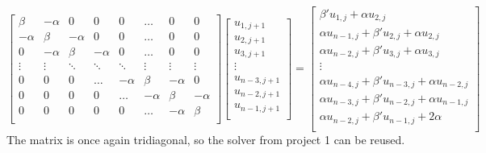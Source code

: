 \documentclass[12pt,english,a4paper]{article}
\begin{document}
\[
    \begin{bmatrix}
        \beta & -\alpha & 0 & 0 & 0 & \dots & 0 & 0  \\
        -\alpha & \beta & -\alpha & 0 & 0 & \dots & 0 & 0  \\
        0 & -\alpha & \beta & -\alpha & 0 & \dots & 0 & 0 \\
        \vdots & \vdots &  \ddots & \ddots & \ddots & \vdots & \vdots & \vdots\\
        0 & 0 & 0 & \dots & -\alpha & \beta & - \alpha & 0\\
        0 & 0 & 0 & 0 & \dots & -\alpha & \beta & - \alpha\\
        0 & 0 & 0 & 0 & 0 & \dots & -\alpha & \beta\\
    \end{bmatrix}
    \begin{bmatrix}
        u_{1,j+1}\\
        u_{2,j+1}\\
        u_{3,j+1}\\
        \vdots\\
        u_{n-3,j+1}\\
        u_{n-2,j+1}\\
        u_{n-1,j+1}\\
    \end{bmatrix}
    =
    \begin{bmatrix}
        \beta' u_{1,j} + \alpha u_{2,j}\\
        \alpha u_{n-1,j} + \beta' u_{2,j} + \alpha u_{2,j}\\
        \alpha u_{n-2,j} + \beta' u_{3,j} + \alpha u_{3,j}\\
        \vdots\\
        \alpha u_{n-4,j} + \beta' u_{n-3,j} + \alpha u_{n-2,j}\\
        \alpha u_{n-3,j} + \beta' u_{n-2,j} + \alpha u_{n-1,j}\\
        \alpha u_{n-2,j} + \beta' u_{n-1,j} + 2\alpha\\
    \end{bmatrix}
\]
The matrix is once again tridiagonal, so the solver from project 1 can be reused.
\end{document}
